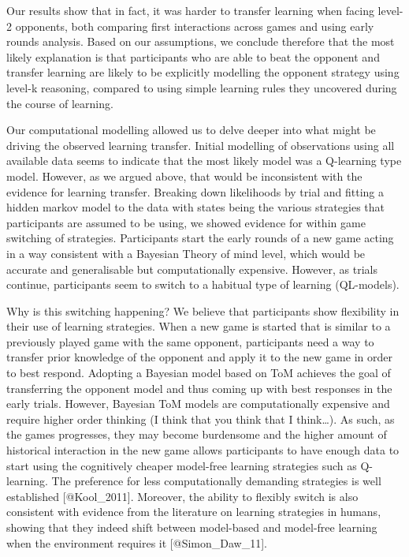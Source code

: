 \documentclass[man,floatsintext]{apa6}
\begin{document}
Our results show that in fact, it was harder to transfer learning when facing level-2 opponents, both comparing first interactions across games and using early rounds analysis. Based on our assumptions, we conclude therefore that the most likely explanation is that participants who are able to beat the opponent and transfer learning are likely to be explicitly modelling the opponent strategy using level-k reasoning, compared to using simple learning rules they uncovered during the course of learning.

Our computational modelling allowed us to delve deeper into what might be driving the observed learning transfer. Initial modelling of observations using all available data seems to indicate that the most likely model was a Q-learning type model. However, as we argued above, that would be inconsistent with the evidence for learning transfer. Breaking down likelihoods by trial and fitting a hidden markov model to the data with states being the various strategies that participants are assumed to be using, we showed evidence for within game switching of strategies. Participants start the early rounds of a new game acting in a way consistent with a Bayesian Theory of mind level, which would be accurate and generalisable but computationally expensive. However, as trials continue, participants seem to switch to a habitual type of learning (QL-models).

Why is this switching happening? We believe that participants show flexibility in their use of learning strategies. When a new game is started that is similar to a previously played game with the same opponent, participants need a way to transfer prior knowledge of the opponent and apply it to the new game in order to best respond. Adopting a Bayesian model based on ToM achieves the goal of transferring the opponent model and thus coming up with best responses in the early trials. However, Bayesian ToM models are computationally expensive and require higher order thinking (I think that you think that I think\ldots{}). As such, as the games progresses, they may become burdensome and the higher amount of historical interaction in the new game allows participants to have enough data to start using the cognitively cheaper model-free learning strategies such as Q-learning. The preference for less computationally demanding strategies is well established {[}@Kool\_2011{]}. Moreover, the ability to flexibly switch is also consistent with evidence from the literature on learning strategies in humans, showing that they indeed shift between model-based and model-free learning when the environment requires it {[}@Simon\_Daw\_11{]}.
\end{document}

